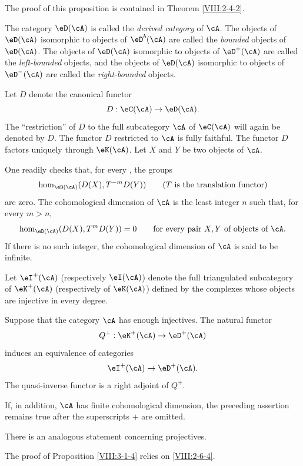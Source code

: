 The proof of this proposition is contained in Theorem \ref{VIII:2-4-2}.

\begin{definition}\label{VIII:3-1-3}
The category $\eD(\cA)$ is called the \emph{derived category} of $\cA$.
The objects of $\eD(\cA)$ isomorphic to objects of $\eD^b(\cA)$ are
called the \emph{bounded} objects of $\eD(\cA)$. The objects of
$\eD(\cA)$ isomorphic to objects of $\eD^+(\cA)$ are called the
\emph{left-bounded} objects, and the objects of $\eD(\cA)$ isomorphic to
objects of $\eD^-(\cA)$ are called the \emph{right-bounded} objects.
\end{definition}

Let $D$ denote the canonical functor
\[
  D : \eC(\cA) \to \eD(\cA) \text{.}
\]
The “restriction” of $D$ to the full subcategory $\cA$ of $\eC(\cA)$
will again be denoted by $D$. The functor $D$ restricted to $\cA$ is fully
faithful. The functor $D$ factors uniquely through $\eK(\cA)$. Let $X$
and $Y$ be two objects of $\cA$.

One readily checks that, for every , the groups
\[
  \hom_{\eD(\cA)}(D(X),T^{-m} D(Y)) \qquad \text{($T$ is the translation functor)}
\]
are zero. The cohomological dimension of $\cA$ is the least integer $n$
such that, for every $m>n$,
\[
  \hom_{\eD(\cA)}(D(X),T^m D(Y)) = 0 \qquad\text{for every pair $X,Y$ of objects of $\cA$.}
\]
If there is no such integer, the cohomological dimension of $\cA$ is said
to be infinite.

Let $\eI^+(\cA)$ (respectively $\eI(\cA)$) denote the full triangulated
subcategory of $\eK^+(\cA)$ (respectively of $\eK(\cA)$) defined by the
complexes whose objects are injective in every degree.

\begin{proposition}\label{VIII:3-1-4}
Suppose that the category $\cA$ has enough injectives. The natural functor
\[
  Q^+:\eK^+(\cA) \to \eD^+(\cA)
\]
induces an equivalence of categories
\[
  \eI^+(\cA) \to \eD^+(\cA)  \text{.}
\]
The quasi-inverse functor is a right adjoint of $Q^+$.
\end{proposition}

If, in addition, $\cA$ has finite cohomological dimension, the preceding
assertion remains true after the superscripts $+$ are omitted.

There is an analogous statement concerning projectives.

The proof of Proposition \ref{VIII:3-1-4} relies on
\ref{VIII:2-6-4}.

